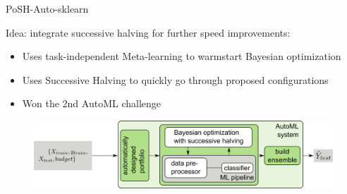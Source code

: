 \begin{frame}[c]{PoSH-Auto-sklearn} 

Idea: integrate successive halving for further speed improvements:
\begin{itemize}
    \item Uses task-independent Meta-learning to warmstart Bayesian optimization
    \item Uses Successive Halving to quickly go through proposed configurations
    \item Won the 2nd AutoML challenge
\end{itemize}

\begin{figure}
    \centering
    \includegraphics[width=\textwidth]{images/success_stories/automl_bo_po_es.png}
\end{figure}

\end{frame}


